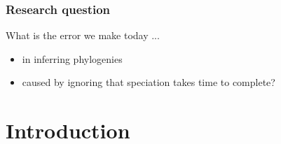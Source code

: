 \documentclass{beamer}
\begin{document}
\begin{frame}
  \frametitle{Research question}

  What is the error we make today ...

  \begin{itemize}
    \item in inferring phylogenies
    \item caused by ignoring that speciation takes time to complete?
  \end{itemize}

\end{frame}

\section[Introduction]{Introduction}
\end{document}
